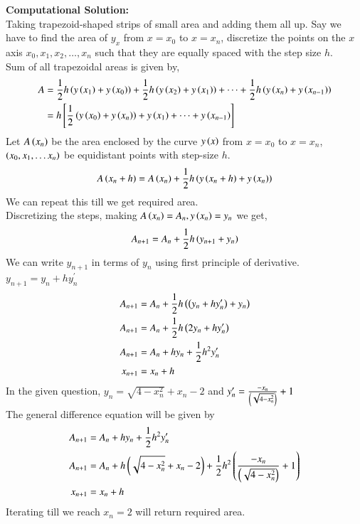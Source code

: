\documentclass[journal]{IEEEtran}
\begin{document}
\textbf{Computational Solution:}\\

Taking trapezoid-shaped strips of small area and adding them all up. Say we have to find the area of $y_{x}$ from $x=x_0$ to $x=x_n$, discretize the points on the $x$ axis $x_0, x_1, x_2, \dots, x_n$ such that they are equally spaced with the step size $h$. \\
Sum of all trapezoidal areas is given by,
\begin{align}
  A&=\frac{1}{2}h\left(y\left(x_1\right)+y\left(x_0\right)\right)+ \frac{1}{2}h\left(y\left(x_2\right)+y\left(x_1\right)\right)+\dots+\frac{1}{2}h\left(y\left(x_n\right)+y\left(x_{n-1}\right)\right)\\
  &=h{}\left[\frac{1}{2}\left(y\left(x_0\right)+y\left(x_n\right)\right)+ y\left(x_1\right)+\dots+y\left(x_{n-1}\right)\right]
\end{align}
Let $A\left(x_n\right)$ be the area enclosed by the curve $y\left(x\right)$ from $x=x_0$ to $x=x_n$, $\left(x_0, x_1, \dots x_n\right)$ be equidistant points with step-size $h$.
\begin{align}
  A\left(x_n+h\right)=A\left(x_n\right)+\frac{1}{2}h\left(y\left(x_n+h\right)+y\left(x_n\right)\right)
\end{align}
We can repeat this till we get required area.\\
Discretizing the steps, making $A\left(x_n\right)=A_n, y\left(x_n\right)=y_n$ we get,
\begin{align}
 A_{n+1}=A_n+\frac{1}{2}h\left(y_{n+1}+y_n\right)
\end{align}
We can write $y_{n+1}$ in terms of $y_n$ using first principle of derivative. $y_{n+1}=y_n+hy^{\prime}_n$
\begin{align}
  A_{n+1}&=A_n+\frac{1}{2}h\left(\left(y_{n}+hy^{\prime}_n\right)+y_n\right)\\
  A_{n+1}&=A_n+\frac{1}{2}h\left(2y_n+hy^{\prime}_n\right)\\
  A_{n+1}&=A_n+hy_n+\frac{1}{2}h^2y^{\prime}_n\\
  x_{n+1}&=x_n+h
\end{align}
In the given question, $y_n=\sqrt{4-x_n^2} + x_n -2$ and $y^{\prime}_n= \frac{-x_n}{\left(\sqrt{4-x_n^2}\right)} +1 $\\
The general difference equation will be given by
\begin{align}
  A_{n+1}&=A_n+hy_n+\frac{1}{2}h^2y^{\prime}_n\\
  A_{n+1}&=A_n+h\left(\sqrt{4-x_n^2} + x_n -2\right)+\frac{1}{2}h^2\left(\frac{-x_n}{\left(\sqrt{4-x_n^2}\right)} +1\right)\\
  x_{n+1}&=x_n+h
\end{align}
Iterating till we reach $x_n=2$ will return required area. \\
\end{document}
